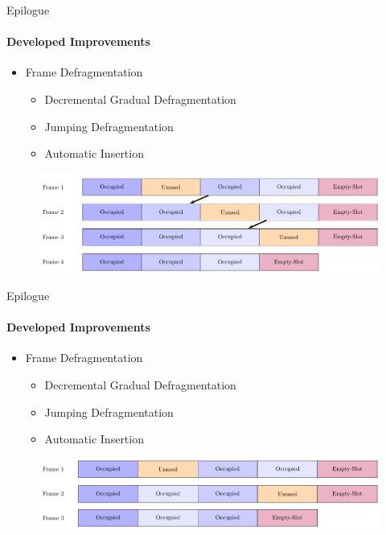         \begin{frame}[t]{Epilogue}\framesubtitle{Developed Improvements}
                    \begin{itemize}
                        \item<1-4> Frame Defragmentation
                            \begin{itemize}
                                \item<1,2> Decremental Gradual Defragmentation
                                \item<1,3> Jumping Defragmentation
                                \item<1,4> Automatic Insertion
                            \end{itemize}
                    \end{itemize}
                    \begin{figure}
                        \includegraphics[width=1\textwidth]{images/dgd.pdf}
                    \end{figure}
        \end{frame}
                \begin{frame}[t]{Epilogue}\framesubtitle{Developed Improvements}
                    \begin{itemize}
                        \item<1-4> Frame Defragmentation
                            \begin{itemize}
                                \item<1,2> Decremental Gradual Defragmentation
                                \item<1,3> Jumping Defragmentation
                                \item<1,4> Automatic Insertion
                            \end{itemize}
                    \end{itemize}
                    \begin{figure}
                        \includegraphics[width=1\textwidth]{images/jd.pdf}
                    \end{figure}
        \end{frame}
